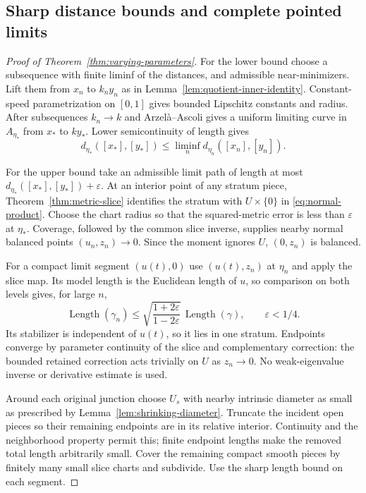 \subsection{Sharp distance bounds and complete pointed limits}
\begin{proof}[Proof of Theorem~\ref{thm:varying-parameters}]
For the lower bound choose a subsequence with finite liminf of
the distances, and admissible near-minimizers. Lift them from $x_n$
to $k_ny_n$ as in Lemma~\ref{lem:quotient-inner-identity}.
Constant-speed parametrization on $[0,1]$ gives bounded Lipschitz
constants and radius. After subsequences $k_n\to k$ and
Arzel\`a--Ascoli gives a uniform limiting curve in $A_{\eta_*}$
from $x_*$ to $ky_*$. Lower semicontinuity of length gives
\[
 d_{\eta_*}([x_*],[y_*])
 \le\liminf_n d_{\eta_n}([x_n],[y_n]).
\]

For the upper bound take an admissible limit path of length at most
$d_{\eta_*}([x_*],[y_*])+\varepsilon$.
At an interior point of any stratum piece,
Theorem~\ref{thm:metric-slice} identifies the stratum with
$U\times\{0\}$ in \eqref{eq:normal-product}.
Choose the chart radius so that the squared-metric error is less
than $\varepsilon$ at $\eta_*$. Coverage, followed by the common
slice inverse, supplies nearby normal balanced points
$(u_n,z_n)\to0$. Since the moment ignores $U$, $(0,z_n)$ is balanced.

For a compact limit segment $(u(t),0)$ use $(u(t),z_n)$ at
$\eta_n$ and apply the slice map. Its model length is the Euclidean
length of $u$, so comparison on both levels gives, for large $n$,
\[
 \operatorname{Length}(\gamma_n)
 \le\sqrt{\frac{1+2\varepsilon}{1-2\varepsilon}}\,
        \operatorname{Length}(\gamma),\qquad\varepsilon<1/4.
\]
Its stabilizer is independent of $u(t)$, so it lies in one stratum.
Endpoints converge by parameter continuity of the slice and
complementary correction: the bounded retained correction acts
trivially on $U$ as $z_n\to0$.
No weak-eigenvalue inverse or derivative estimate is used.

Around each original junction choose $U_s$ with nearby intrinsic
diameter as small as prescribed by Lemma~\ref{lem:shrinking-diameter}.
Truncate the incident open pieces so their remaining endpoints
are in its relative interior. Continuity and the neighborhood
property permit this; finite endpoint lengths make the removed
total length arbitrarily small. Cover the remaining compact
smooth pieces by finitely many small slice charts and subdivide.
Use the sharp length bound on each segment.


\end{proof}

